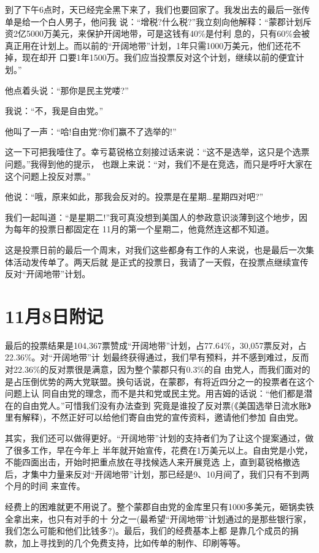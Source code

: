 ﻿\documentclass[11pt]{article}
\begin{document}
到了下午6点时，天已经完全黑下来了，我们也要回家了。我发出去的最后一张传单是给一个白人男子，他问我
说：``增税?什么税?''我立刻向他解释：``蒙郡计划斥资2亿5000万美元，来保护开阔地带，可是这钱有40\%是付利
息的，只有60\%会被真正用在计划上。而以前的``开阔地带''计划，1年只需1000万美元，他们还花不掉，现在却开
口要1年1500万。我们应当投票反对这个计划，继续以前的便宜计划。''

他点着头说：``那你是民主党喽?''

我说：``不，我是自由党。''

他叫了一声：``哈!自由党?你们赢不了选举的!''

这一下可把我噎住了。幸亏葛锐格立刻接过话来说：``这不是选举，这只是个选票问题。''我得到他的提示，
也跟上来说：``对，我们不是在竞选，而只是呼吁大家在这个问题上投反对票。''

他说：``哦，原来如此，那我会反对的。投票是在星期\ldots 星期四对吧?''

我们一起叫道：``是星期二!''我可真没想到美国人的参政意识淡薄到这个地步，因为每年的投票日都固定在
11月的第一个星期二，他竟然连这都不知道。

这是投票日前的最后一个周末，对我们这些都身有工作的人来说，也是最后一次集体活动发传单了。两天后就
是正式的投票日，我请了一天假，在投票点继续宣传反对``开阔地带''计划。

\section{11月8日附记}

最后的投票结果是104,367票赞成``开阔地带''计划，占77.64\%，30,057票反对，占22.36\%。对``开阔地带''计
划最终获得通过，我们早有预料，并不感到难过，反而对22.36\%的反对票很是满意，因为整个蒙郡只有0.3\%的自
由党人，而我们面对的是占压倒优势的两大党联盟。换句话说，在蒙郡，有将近四分之一的投票者在这个问题上认
同自由党的理念，而不是共和党或民主党。用吉姆的话说：``他们都是潜在的自由党人。''可惜我们没有办法查到
究竟是谁投了反对票(《美国选举日流水账》里有解释)，不然正好可以给他们寄自由党的宣传资料，邀请他们参加
自由党。

其实，我们还可以做得更好。``开阔地带''计划的支持者们为了让这个提案通过，做了很多工作，早在今年上
半年就开始宣传，花费在1万美元以上。自由党是小党，不能四面出击，开始时把重点放在寻找候选人来开展竞选
上，直到葛锐格撤选后，才集中力量来反对``开阔地带''计划，那已经是9、10月间了，我们只有不到两个月的时间
来宣传。

经费上的困难就更不用说了。整个蒙郡自由党的金库里只有1000多美元，砸锅卖铁全拿出来，也只有对手的十
分之一(最希望``开阔地带''计划通过的是那些银行家，我们怎么可能和他们比钱多?)。最后，我们的经费基本上都
是靠几个成员的捐款，加上寻找到的几个免费支持，比如传单的制作、印刷等等。
\end{document}

